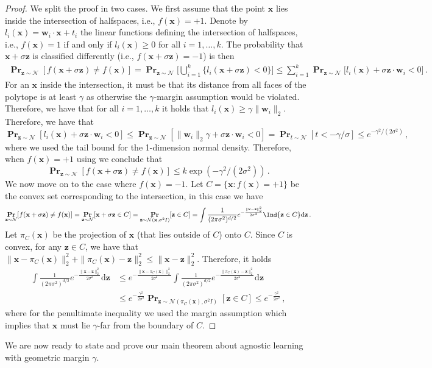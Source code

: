 \documentclass[10pt,a4paper]{article}
\renewcommand\vec[1]{\mathbf{#1}}
\DeclareMathOperator*{\pr}{\mathbf{Pr}}
\def\d{\mathrm{d}}
\newcommand{\normal}{\mathcal{N}}
\newcommand{\1}{\Ind}
\newcommand{\x}{\vec x}
\newcommand{\z}{\vec z}
\begin{document}
\begin{proof}
We split the proof in two cases.  We first assume that the point $\x$ lies inside the intersection of halfspaces, i.e., $f(\x) = +1$.  Denote by $l_i(\x)= \vec w_i \cdot \x + t_i$ the linear functions
defining the intersection of halfspaces, i.e., $f(\x) = 1$ if and only if $l_i(\x) \geq 0$ for all $i=1,\ldots, k$.  The probability that $\x + \sigma \vec z$ is classified differently (i.e., 
$f(\x + \sigma \vec z) = -1$) is then 
\begin{align}
\pr_{\z \sim \normal}[f(\x + \sigma \z) \neq f(\x)] 
= 
\pr_{\z \sim \normal}\Big[\bigcup_{i=1}^k \{ l_i(\vec x + \sigma \vec z) < 0 \}\Big] 
\leq 
\sum_{i=1}^k  \pr_{\z \sim \normal}\Big[ l_i(\vec x) + \sigma \vec z \cdot \vec w_i < 0\Big] 
\label{eq:union-bound-inside-margin-intersection}
\,.
\end{align}
For an $\x$ inside the intersection, it must be that its distance from all faces of the polytope 
is at least $\gamma$ as otherwise the $\gamma$-margin assumption would be violated.
Therefore, we have that for all $i=1, \ldots, k$ it holds that 
$l_i(\x) \geq \gamma \|\vec w_i\|_2$.  Therefore, we have that
$ 
\pr_{\z \sim \normal}[ l_i(\vec x) + \sigma \vec z \cdot \vec w_i < 0] 
\leq 
\pr_{\z \sim \normal}[ \|\vec w_i\|_2 \gamma + \sigma \vec z \cdot \vec w_i < 0] 
=
\pr_{t \sim \normal}[ t < -\gamma/\sigma] 
\leq e^{-\gamma^2/(2 \sigma^2)}
\,,
$
where we used the tail bound for the 1-dimension normal density.
Therefore, when $f(\x) = +1$ using  we 
conclude that 
\[
\pr_{\z \sim \normal}[f(\x + \sigma \z) \neq f(\x)] 
\leq k \exp(-\gamma^2/(2\sigma^2)) \,.
\]
We now move on to the case where $f(\x) = -1$.  Let $C = \{\x : f(\x) = +1\}$ be the convex set corresponding to the intersection, in this case we have 
\[
\pr_{\z \sim \normal}[f(\x + \sigma \z) \neq f(\x)] 
=
\pr_{\z \sim \normal}[\x + \sigma \z \in C] 
=
\pr_{\z \sim \normal(\x, \sigma^2 I)}[\z \in C] 
= \int \frac{1}{(2 \pi \sigma^2)^{d/2}} e^{-\frac{\|\x - \vec z\|_2^2}{ 2 \sigma^2}}
\1\{ \vec z \in C\}
\d \vec z
\,.
\]
Let $\pi_C(\x)$ be the projection of $\x$ (that lies outside of $C$) onto $C$. 
Since $C$ is convex, for any $\vec z \in C$, we have that 
$\|\x - \pi_C(\x)\|_2^2 + \|\pi_C(\x) - \vec z\|_2^2 \leq \|\vec x - \vec z\|_2^2$.
Therefore, it holds 
\begin{align*}
 \int \frac{1}{(2 \pi \sigma^2)^{d/2}} e^{-\frac{\|\x - \vec z\|_2^2}{ 2 \sigma^2}} \d \vec z
 &\leq 
 e^{- \frac{\|\vec x - \pi_C(\x)\|_2^2}{2 \sigma^2}} 
 \int \frac{1}{(2 \pi \sigma^2)^{d/2}} e^{-\frac{\|\pi_C(\x) - \vec z\|_2^2}{ 2 \sigma^2}} \d \vec z
 \\
 &\leq
 e^{- \frac{\gamma^2}{2 \sigma^2}} 
 \pr_{\vec z \sim \normal(\pi_C(\x), \sigma^2 I)}[\vec z \in C]
 \leq 
 e^{- \frac{\gamma^2}{2 \sigma^2}} 
 \,,
\end{align*}
where for the penultimate inequality we used the margin assumption which implies that $\x$ must lie $\gamma$-far from the boundary of $C$.
\end{proof}
We are now ready to state and prove our main theorem about agnostic learning with geometric margin $\gamma$.
\end{document}
